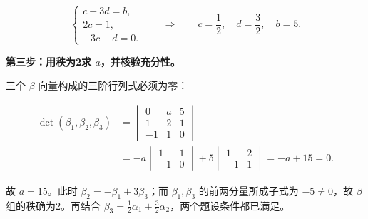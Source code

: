 \documentclass[UTF8,11pt,fontset=windows]{ctexart}
\begin{document}
$$
\begin{cases}
c+3d=b,\\
2c=1,\\
-3c+d=0.
\end{cases}
\qquad\Longrightarrow\qquad
c=\frac12,\quad d=\frac32,\quad b=5.
$$

\textbf{第三步：用秩为2求 $a$，并核验充分性。}

三个 $\beta$ 向量构成的三阶行列式必须为零：

$$
\begin{aligned}
\det(\beta_1,\beta_2,\beta_3)
&=\begin{vmatrix}0&a&5\\1&2&1\\-1&1&0\end{vmatrix}\\
&=-a\begin{vmatrix}1&1\\-1&0\end{vmatrix}
 +5\begin{vmatrix}1&2\\-1&1\end{vmatrix}
=-a+15=0.
\end{aligned}
$$

故 $a=15$。此时 $\beta_2=-\beta_1+3\beta_3$；而 $\beta_1,\beta_3$ 的前两分量所成子式为 $-5\ne0$，故 $\beta$ 组的秩确为2。再结合 $\beta_3=\tfrac12\alpha_1+\tfrac32\alpha_2$，两个题设条件都已满足。
\end{document}

